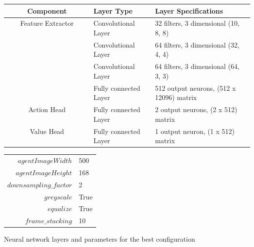 


\begin{figure}
    \begin{center}
    \begin{tabular}{|| c | p{0.25\linewidth} | p{0.4\linewidth} ||} 
        \hline
        Component & Layer Type & Layer Specifications \\ [0.5ex] 
        \hline\hline
        \multirow{4}{*}{Feature Extractor} & Convolutional Layer & 32 filters, 3 dimensional (10, 8, 8) \\\cline{2-3}
        & Convolutional Layer & 64 filters, 3 dimensional (32, 4, 4) \\\cline{2-3}
        & Convolutional Layer & 64 filters, 3 dimensional (64, 3, 3) \\\cline{2-3}
        & Fully connected Layer & 512 output neurons, (512 x 12096) matrix \\
        \hline
        Action Head & Fully connected Layer & 2 output neurons, (2 x 512) matrix \\
        \hline
        Value Head & Fully connected Layer & 1 output neuron, (1 x 512) matrix \\
        \hline
    \end{tabular}
    \begin{tabular}{r@{: }l}
        $agentImageWidth$ & 500 \\
        $agentImageHeight$ & 168 \\
        $downsampling\_factor$ & 2 \\
        $greyscale$ & True \\
        $equalize$ & True \\
        $frame\_stacking$ & 10 \\
    \end{tabular}
    \end{center}
    \caption{Neural network layers and parameters for the best configuration}
    \label{fig:network_architecture}
\end{figure}


